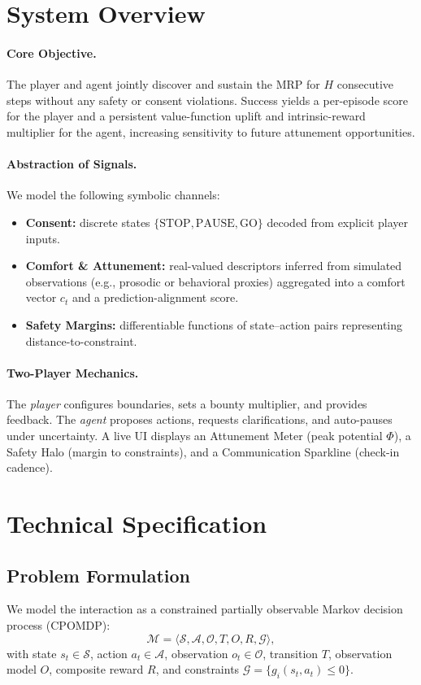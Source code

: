 \documentclass[12pt]{article}
\begin{document}
\section{System Overview}
\paragraph{Core Objective.} The player and agent jointly discover and sustain the MRP for $H$ consecutive steps without any safety or consent violations. Success yields a per-episode score for the player and a persistent value-function uplift and intrinsic-reward multiplier for the agent, increasing sensitivity to future attunement opportunities.

\paragraph{Abstraction of Signals.} We model the following symbolic channels:
\begin{itemize}[leftmargin=*]
  \item \textbf{Consent:} discrete states $\{\text{STOP},\text{PAUSE},\text{GO}\}$ decoded from explicit player inputs.
  \item \textbf{Comfort \& Attunement:} real-valued descriptors inferred from simulated observations (e.g., prosodic or behavioral proxies) aggregated into a comfort vector $c_t$ and a prediction-alignment score.
  \item \textbf{Safety Margins:} differentiable functions of state--action pairs representing distance-to-constraint.
\end{itemize}

\paragraph{Two-Player Mechanics.} The \emph{player} configures boundaries, sets a bounty multiplier, and provides feedback. The \emph{agent} proposes actions, requests clarifications, and auto-pauses under uncertainty. A live UI displays an Attunement Meter (peak potential $\Phi$), a Safety Halo (margin to constraints), and a Communication Sparkline (check-in cadence).

\section{Technical Specification}
\subsection{Problem Formulation}
We model the interaction as a constrained partially observable Markov decision process (CPOMDP):
\[
\mathcal{M} = \langle \mathcal{S},\mathcal{A},\mathcal{O},T,O,R,\mathcal{G} \rangle,
\]
with state $s_t\in\mathcal{S}$, action $a_t\in\mathcal{A}$, observation $o_t\in\mathcal{O}$, transition $T$, observation model $O$, composite reward $R$, and constraints $\mathcal{G}=\{g_i(s_t,a_t)\le 0\}$.
\end{document}
